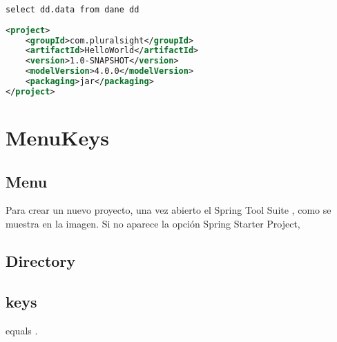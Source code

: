 	
	
	
	
	
	
\begin{lstlisting}[caption={Some Java code},label={lst:label},style=terminal]
select dd.data from dane dd 
\end{lstlisting}
		
\begin{lstlisting}[caption={A simple listing.}, label={lst:simple}, language=XML]
<project>
	<groupId>com.pluralsight</groupId>
	<artifactId>HelloWorld</artifactId>
	<version>1.0-SNAPSHOT</version>
	<modelVersion>4.0.0</modelVersion>
	<packaging>jar</packaging>
</project>
	\end{lstlisting}
\section{MenuKeys}

	\subsection{Menu}

	Para crear un nuevo proyecto, una vez abierto el Spring Tool Suite , como se muestra en la imagen. Si no aparece la opción Spring Starter Project, 
	
	\subsection{Directory}
	
	
	\subsection{keys}
	
	 equals .
	
	
